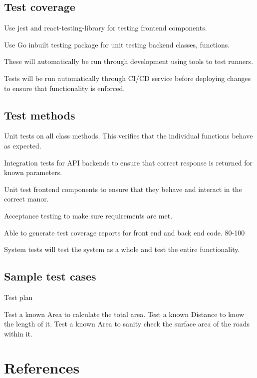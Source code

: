 \documentclass[a4paper,11pt]{article}
\begin{document}
\subsection{Test coverage}


Use jest and react-testing-library for testing frontend components.

Use Go inbuilt testing package for unit testing backend classes, functions.

These will automatically be run through development using tools to test runners.

Tests will be run automatically through CI/CD service before deploying changes to ensure that functionality is enforced.

\subsection{Test methods}


Unit tests on all class methods. This verifies that the individual functions behave as expected.

Integration tests for API backends to ensure that correct response is returned for known parameters.

Unit test frontend components to ensure that they behave and interact in the correct manor.

Acceptance testing to make sure requirements are met.

Able to generate test coverage reports for front end and back end code. 80-100%

System tests will test the system as a whole and test the entire functionality.


\subsection{Sample test cases}


Test plan

Test a known Area to calculate the total area.
Test a known Distance to know the length of it.
Test a known Area to sanity check the surface area of the roads within it.


\pagebreak

\section{References}
\end{document}
